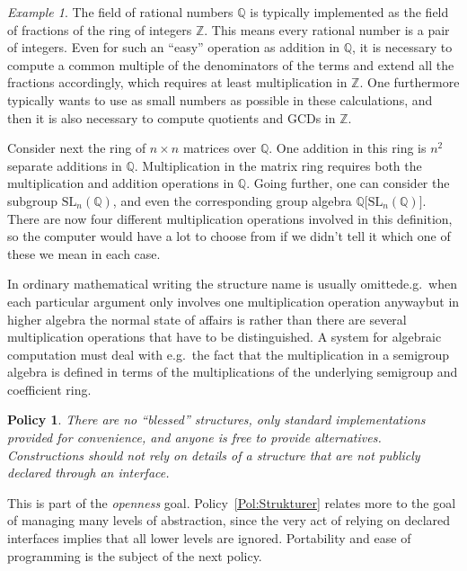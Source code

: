\documentclass{mtmtcl}
\theoremstyle{plain}
\newtheorem{policy}{Policy}
\theoremstyle{remark}
\newtheorem*{example}{Example}
\begin{document}
\begin{example}
  The field of rational numbers $\mathbb{Q}$ is typically implemented 
  as the field of fractions of the ring of integers $\mathbb{Z}$. 
  This means every rational number is a pair of integers. Even for 
  such an ``easy'' operation as addition in $\mathbb{Q}$, it is 
  necessary to compute a common multiple of the denominators of the 
  terms and extend all the fractions accordingly, which requires at 
  least multiplication in $\mathbb{Z}$. One furthermore typically 
  wants to use as small numbers as possible in these calculations, 
  and then it is also necessary to compute quotients and GCDs in 
  $\mathbb{Z}$.
  
  Consider next the ring of $n \times n$ matrices over $\mathbb{Q}$. 
  One addition in this ring is $n^2$ separate additions in $\mathbb{Q}$. 
  Multiplication in the matrix ring requires both the multiplication 
  and addition operations in $\mathbb{Q}$. Going further, one can 
  consider the subgroup $\mathrm{SL}_n(\mathbb{Q})$, and even the 
  corresponding group algebra $\mathbb{Q}\bigl[ 
  \mathrm{SL}_n(\mathbb{Q}) \bigr]$. There are now four different 
  multiplication operations involved in this definition, so the 
  computer would have a lot to choose from if we didn't tell it which 
  one of these we mean in each case.
\end{example}

In ordinary mathematical writing the structure name 
is usually omitted\Ldash e.g.~when each particular argument only 
involves one multiplication operation anyway\Rdash but in higher 
algebra the normal state of affairs is rather than there are 
several multiplication operations that have to be distinguished. 
A system for algebraic computation must deal with e.g.~the fact 
that the multiplication in a semigroup algebra is defined in 
terms of the multiplications of the underlying semigroup and 
coefficient ring.

\begin{policy}
  There are no ``blessed'' structures, only standard implementations 
  provided for convenience, and anyone is free to provide 
  alternatives. Constructions should not rely on details of a 
  structure that are not publicly declared through an interface.
\end{policy}

This is part of the \emph{openness} goal. Policy~\ref{Pol:Strukturer} 
relates more to the goal of managing many levels of abstraction, 
since the very act of relying on declared interfaces implies that 
all lower levels are ignored. Portability and ease of programming is 
the subject of the next policy.
\end{document}
